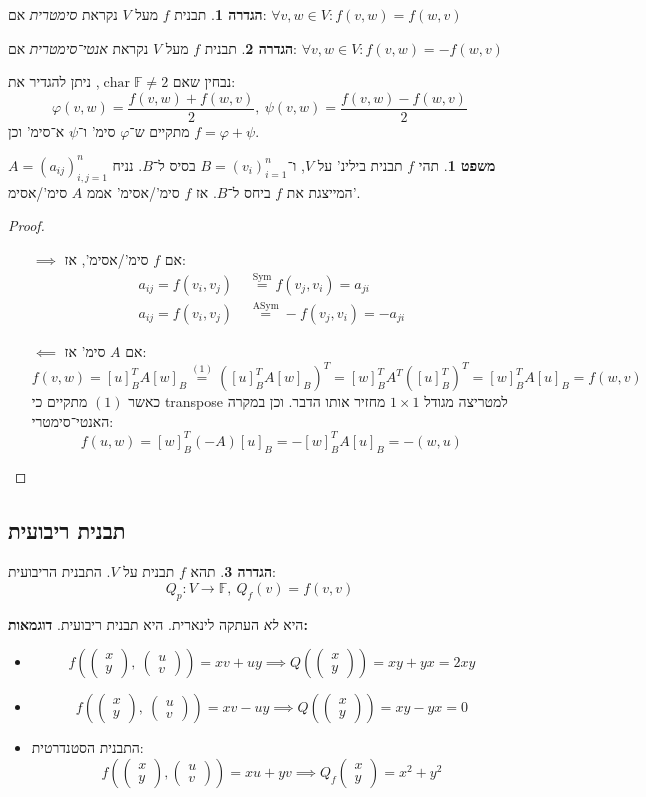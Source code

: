 \documentclass[a4paper]{article}
\DeclareMathOperator{\chr}     {char}
\DeclareMathOperator{\sym}     {Sym}
\DeclareMathOperator{\asym}    {ASym}
\newcommand\F         {\mathbb{F}}
\newcommand\co        {\colon}
\newcommand\pms[1]    {\begin{pmatrix}
		#1
\end{pmatrix}}
\newcommand\cl [1]    {\left ( #1 \right )}
\renewcommand\phi     {\varphi}
\theoremstyle{definition}
\newtheorem{Theorem}{משפט}
\newtheorem{definition}{הגדרה}
\newcommand\theo  [1] {\begin{Theorem}#1\end{Theorem}}
\newcommand\defi  [1] {\begin{definition}#1\end{definition}}
\begin{document}
	\defi{תבנית $f$ מעל $V$ נקראת \textit{סימטרית} אם: \hfill $\forall v, w \in V \co f(v, w) = f(w, v)$}
	\defi{תבנית $f$ מעל $V$ נקראת \textit{אנטי־סימטרית} אם: \hfill $\forall v, w \in V \co f(v, w) = -f(w, v)$}
	נבחין שאם $\chr \F \neq 2$, ניתן להגדיר את: 
	\[ \phi(v, w) = \frac{f(v, w) + f(w, v)}{2}, \ \psi(v, w) = \frac{f(v, w) - f(w, v)}{2} \]
	מתקיים ש־$\phi$ סימ' ו־$\psi$ א־סימ' וכן $f = \phi + \psi$. 
	
	\theo{תהי $f$ תבנית בילינ' על $V$, ו־$B = (v_i)_{i = 1}^{n}$ בסיס ל־$B$. נניח $A =(a_{ij})^{n}_{i, j = 1}$ המייצגת את $f$ ביחס ל־$B$. אז $f$ סימ'/אסימ' אממ $A$ סימ'/אסימ'. }
	
	\begin{proof}
		\begin{itemize}
			\item[$\implies$] אם $f$ סימ'/אסימ', אז: 
			\begin{align*}
				a_{ij} = f(v_i, v_j) &\overset{\sym}{=} f(v_j, v_i) = a_{ji} \\
				a_{ij} = f(v_i, v_j) \,\,&\!\!\overset{\asym}{=} -f(v_j, v_i) = -a_{ji}
			\end{align*}
			\item[$\impliedby$] אם $A$ סימ' אז: 
			\[ f(v, w) = [u]_B^TA[w]_B \overset{(1)}{=} ([u]_B^TA[w]_B)^T = [w]_B^TA^T([u]_B^T)^T = [w]^T_BA[u]_B = f(w, v) \]
			כאשר $(1)$ מתקיים כי transpose למטריצה מגודל $1 \times 1$ מחזיר אותו הדבר. וכן במקרה האנטי־סימטרי: 
			\[ f(u, w) = [w]^T_B(-A)[u]_B = -[w]_B^TA[u]_B = -(w, u) \]
		\end{itemize}
	\end{proof}
	
	\subsection{תבנית ריבועית}
	\defi{תהא $f$ תבנית על $V$. התבנית הריבועית: 
		\[ Q_p \co V \to \F, \ Q_f(v) = f(v, v) \]}
	היא \textit{לא} העתקה לינארית. היא תבנית ריבועית. \textbf{דוגמאות: }
	\begin{itemize}
		\item 
		\[ f\cl{\pms{x \\ y}, \ \pms{u \\ v}} = xv + uy \implies Q\cl{\pms{x \\ y}} = xy + yx = 2xy \]
		\item 
		\[ f\cl{\pms{x \\ y}, \ \pms{u \\ v}} = xv - uy \implies Q\cl{\pms{x \\ y}} = xy - yx = 0 \]
		\item התבנית הסטנדרטית: 
		\[ f\cl{\pms{x \\ y}, \pms{u \\ v}} = xu + yv \implies Q_f\pms{x \\ y} = x^2 + y^2 \]
	\end{itemize}
	
\end{document}
